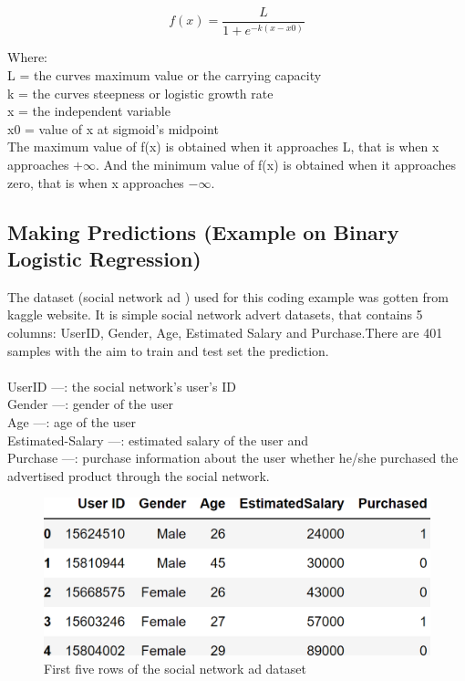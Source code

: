 \documentclass[conference]{IEEEtran}
\begin{document}
\begin{equation} 
\label{equ2}
f(x) = \frac{L}{1 + e{^{-k(x-x0)}}}
\end{equation} 

Where:\\
L = the curves maximum value or the carrying capacity\\
k = the curves steepness or logistic growth rate\\
x = the independent variable\\
x0 = value of x at sigmoid's midpoint\\

The maximum value of f(x) is obtained when it approaches L, that is when x approaches $+\infty$. And the minimum value of f(x) is obtained when it approaches zero, that is when x approaches $-\infty$.

\subsection{Making Predictions (Example on Binary Logistic Regression)}
The dataset (social network ad \cite{cc5} ) used for this coding example was gotten from kaggle website. It is simple social network advert datasets, that contains 5 columns: UserID, Gender, Age, Estimated Salary and Purchase.There are 401 samples with the aim to train and test set the prediction.\\
\\
UserID —: the social network's user's ID\\
Gender —: gender of the user\\
Age —: age of the user\\
Estimated-Salary —: estimated salary of the user and\\
Purchase —: purchase information about the user whether he/she purchased the advertised product through the social network.

\begin{figure}[h]
    \centering
    \includegraphics[scale=0.34]{figs/socialDataset.png}
    \caption{First five rows of the social network ad dataset \cite{cc5}}
    \label{dabc}        
\end{figure}
\end{document}
